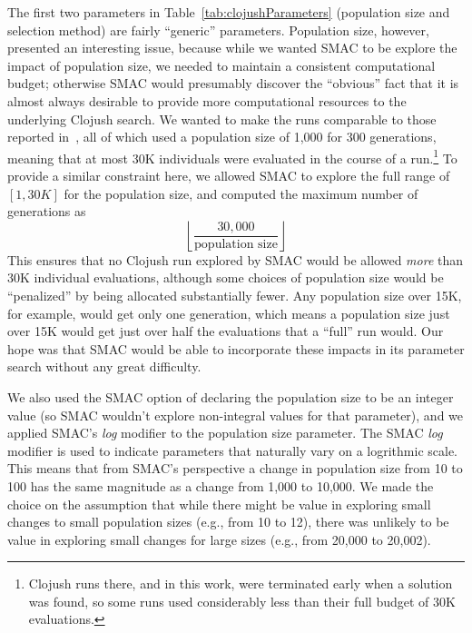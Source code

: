 The first two parameters in Table~\ref{tab:clojushParameters} (population size
and selection method) are fairly ``generic'' parameters. Population size, 
however, presented an interesting issue, because while we wanted SMAC to be
explore the impact of population size, we needed to maintain a consistent
computational budget; otherwise SMAC would presumably discover the ``obvious''
fact that it is almost always desirable to provide more computational resources to the underlying Clojush search. We wanted to make the runs comparable to those
reported in~\cite{Helmuth:2015:GECCO}, all of which used a population size of
1,000 for 300 generations, meaning that at most 30K individuals were evaluated 
in the course of a run.\footnote{Clojush runs there, and in this work, 
	were terminated early when a solution was found, so some runs used
	considerably less than their full budget of 30K evaluations.} To provide
a similar constraint here, we allowed SMAC to explore the full range of 
$[1, 30K]$ for the population size, and computed the maximum number of
generations as
\[
	\left \lfloor{\frac{30,000}{\textrm{population size}}}\right \rfloor
\]
This ensures that no Clojush run explored by SMAC would be allowed 
\emph{more} than 30K individual evaluations, although some choices of 
population size would be ``penalized'' by being allocated substantially fewer. 
Any population size over 15K, for example, would get only one generation, which 
means a population size just over 15K would get just over half the evaluations 
that a ``full'' run would. Our hope was that SMAC would be able to incorporate
these impacts in its parameter search without any great difficulty.

We also used the SMAC option of declaring the population size to be an
integer value (so SMAC wouldn't explore non-integral values for that parameter),
and we applied SMAC's \emph{log} modifier to the population size parameter.
The SMAC \emph{log} modifier is used to indicate parameters that naturally
vary on a logrithmic scale. This means that from SMAC's perspective a change
in population size from 10 to 100 has the same magnitude as a change from 1,000 to
10,000. We made the choice on the assumption that while there might be value
in exploring small changes to small population sizes (e.g., from 10 to 12),
there was unlikely to be value in exploring small changes for large sizes
(e.g., from 20,000 to 20,002).

